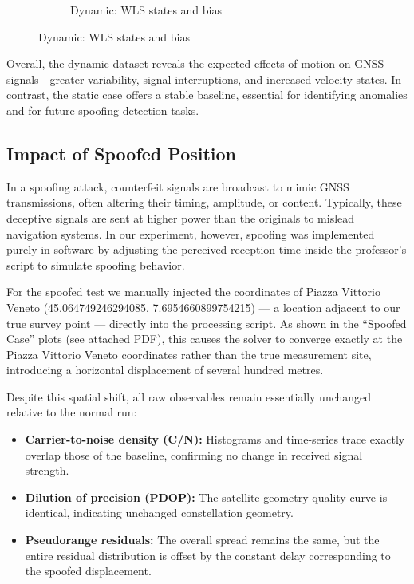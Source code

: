 \begin{figure}[h!]
\begin{subfigure}{0.23\textwidth}
                \caption{Dynamic: WLS states and bias}
            \end{subfigure}
        \end{figure}
    
        \vspace{0.5em}
        \noindent
        Overall, the dynamic dataset reveals the expected effects of motion on GNSS signals—greater variability, signal interruptions, and increased velocity states. In contrast, the static case offers a stable baseline, essential for identifying anomalies and for future spoofing detection tasks.

    \subsection{Impact of Spoofed Position}
        

        In a spoofing attack, counterfeit signals are broadcast to mimic GNSS transmissions, often altering their timing, amplitude, or content. Typically, these deceptive signals are sent at higher power than the originals to mislead navigation systems. In our experiment, however, spoofing was implemented purely in software by adjusting the perceived reception time inside the professor’s script to simulate spoofing behavior.
            
        For the spoofed test we manually injected the coordinates of Piazza Vittorio Veneto (45.064749246294085, 7.6954660899754215) — a location adjacent to our true survey point — directly into the processing script. As shown in the “Spoofed Case” plots (see attached PDF), this causes the solver to converge exactly at the Piazza Vittorio Veneto coordinates rather than the true measurement site, introducing a horizontal displacement of several hundred metres.
        
        Despite this spatial shift, all raw observables remain essentially unchanged relative to the normal run:
        \begin{itemize}
          \item \textbf{Carrier-to-noise density (C/N):} Histograms and time-series trace exactly overlap those of the baseline, confirming no change in received signal strength.
          \item \textbf{Dilution of precision (PDOP):} The satellite geometry quality curve is identical, indicating unchanged constellation geometry.
          \item \textbf{Pseudorange residuals:} The overall spread remains the same, but the entire residual distribution is offset by the constant delay corresponding to the spoofed displacement.
        \end{itemize}
        
